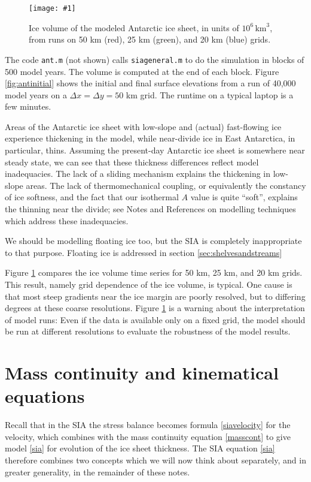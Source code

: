 \documentclass[letterpaper,final,12pt,reqno]{amsart}
\newcommand{\onefigsize}[3]{
\begin{figure}[ht]
\centering
\texttt{[image: \#1]}
\caption{#2}
\label{fig:#1}
\end{figure}}
\newcommand{\onefig}[2]{\onefigsize{#1}{#2}{3.0in}}
\begin{document}
\onefig{antvolcompare}{Ice volume of the modeled Antarctic ice sheet, in units of $10^6 \, \text{km}^3$, from runs on 50 km (red), 25 km (green), and 20 km (blue) grids.}

The code \texttt{ant.m} (not shown) calls \texttt{siageneral.m} to do the simulation in blocks of 500 model years.  The volume is computed at the end of each block.  Figure \ref{fig:antinitial} shows the initial and final surface elevations from a run of 40,000 model years on a $\Delta x = \Delta y = 50$ km grid.  The runtime on a typical laptop is a few minutes.

Areas of the Antarctic ice sheet with low-slope and (actual) fast-flowing ice experience thickening in the model, while near-divide ice in East Antarctica, in particular, thins.  Assuming the present-day Antarctic ice sheet is somewhere near steady state, we can see that these thickness differences reflect model inadequacies.  The lack of a sliding mechanism explains the thickening in low-slope areas.  The lack of thermomechanical coupling, or equivalently the constancy of ice softness, and the fact that our isothermal $A$ value is quite ``soft'', explains the thinning near the divide; see Notes and References on modelling techniques which address these inadequacies.

We should be modelling floating ice too, but the SIA is completely inappropriate to that purpose.  Floating ice is addressed in section \ref{sec:shelvesandstreams}

Figure \ref{fig:antvolcompare} compares the ice volume time series for 50 km, 25 km, and 20 km grids.  This result, namely grid dependence of the ice volume, is typical.  One cause is that most steep gradients near the ice margin are poorly resolved, but to differing degrees at these coarse resolutions.  Figure \ref{fig:antvolcompare} is a warning about the interpretation of model runs:  Even if the data is available only on a fixed grid, the model should be run at different resolutions to evaluate the robustness of the model results.


\section{Mass continuity and kinematical equations}   \label{sec:masscont}

Recall that in the SIA the stress balance becomes formula \eqref{siavelocity} for the velocity, which combines with the mass continuity equation \eqref{masscont} to give model \eqref{sia} for evolution of the ice sheet thickness.  The SIA equation \eqref{sia} therefore combines two concepts which we will now think about separately, and in greater generality, in the remainder of these notes.
\end{document}
